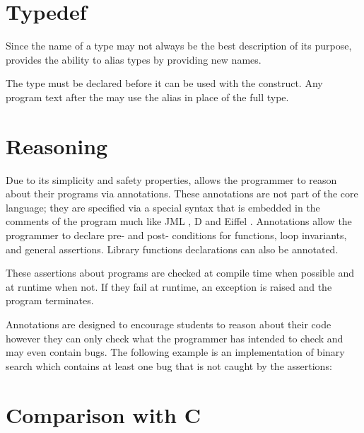 \section{Typedef}

Since the name of a type may not always be the best description of its purpose,
\langname{} provides the ability to alias types by providing new names.

\grammarbegin
{}


\grammarend

The type must be declared before it can be used with the 
construct. Any program text after the  may use the alias in
place of the full type.

\section{Reasoning}

Due to its simplicity and safety properties, \langname{} allows the programmer
to reason about their programs via annotations. These annotations are not part
of the core language; they are specified via a special syntax that is embedded
in the comments of the program much like JML \cite{Leavens-Cheon05}, D
\cite{DLang} and Eiffel \cite{ecma2006ead}. Annotations allow the programmer to
declare pre- and post- conditions for functions, loop invariants, and general
assertions.  Library functions declarations can also be annotated.

These assertions about programs are checked at compile time when possible and
at runtime when not. If they fail at runtime, an exception is raised and the
program terminates.

Annotations are designed to encourage students to reason about their code
however they can only check what the programmer has intended to check and may
even contain bugs. The following example is an implementation of binary search
which contains at least one bug that is not caught by the assertions:


\section{Comparison with C}

